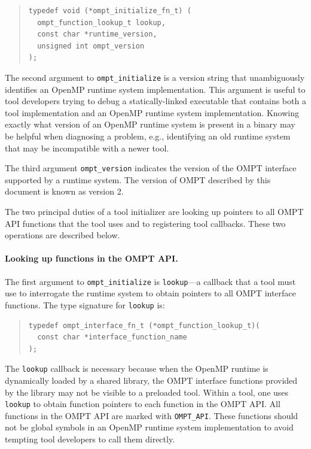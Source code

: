 \documentclass{article}
\begin{document}
\begin{quote}
\begin{verbatim}
typedef void (*ompt_initialize_fn_t) (
  ompt_function_lookup_t lookup,
  const char *runtime_version, 
  unsigned int ompt_version
);
\end{verbatim}
\end{quote}
The second argument to  \verb|ompt_initialize| is a version string that unambiguously identifies an OpenMP runtime system implementation. This argument is useful to tool developers trying to debug a statically-linked executable that contains both a tool implementation and an OpenMP runtime system implementation. Knowing exactly what version of an OpenMP runtime system is present in a binary may be helpful when diagnosing a problem, e.g., identifying an old runtime system that may be incompatible with a newer tool.

The third argument \verb|ompt_version| indicates the version of the OMPT interface supported by a runtime system.
The version of OMPT described by this document is known as version 2.

The two principal duties of a tool initializer are looking up pointers to all OMPT API functions that the tool uses and to registering tool callbacks.  These two operations are described below.

\paragraph{Looking up functions in the OMPT API.} The first argument to \verb|ompt_initialize| is \verb|lookup|---a callback that a tool must use to interrogate the runtime system to obtain pointers to all OMPT interface functions.
The type signature for  \verb|lookup| is:

\begin{quote}
\begin{verbatim}
typedef ompt_interface_fn_t (*ompt_function_lookup_t)(
  const char *interface_function_name
);
\end{verbatim}
\end{quote}

\noindent
The \verb|lookup| callback is necessary because when the OpenMP runtime is dynamically loaded by a shared library, the OMPT interface functions provided by the library may not be visible to a preloaded tool. Within a tool, one uses \verb|lookup| to obtain function pointers to each function in the OMPT API.  All functions in the OMPT API are marked with \verb|OMPT_API|. These functions should not be global symbols in an OpenMP runtime system implementation to avoid tempting tool developers to call them directly. 
\end{document}
